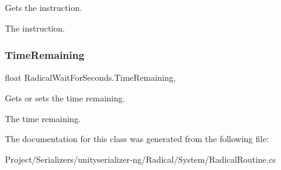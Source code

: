 Gets the instruction. 

The instruction.\mbox{\label{class_radical_wait_for_seconds_a748691ff223a1bdfba6514e04b8b12c6}} 
\subsubsection{\texorpdfstring{Time\+Remaining}{TimeRemaining}}
{\footnotesize\ttfamily float Radical\+Wait\+For\+Seconds.\+Time\+Remaining\hspace{0.3cm}{\ttfamily [get]}, {\ttfamily [set]}}



Gets or sets the time remaining. 

The time remaining.

The documentation for this class was generated from the following file\+:\begin{DoxyCompactItemize}
\item 
Project/\+Serializers/unityserializer-\/ng/\+Radical/\+System/Radical\+Routine.\+cs\end{DoxyCompactItemize}
